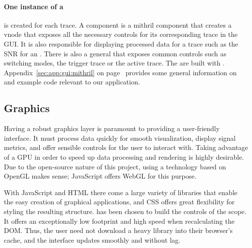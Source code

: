 \paragraph{One instance  of a }  is created for each  trace.  A
  component  is  a  mithril  component  that  creates  a  vnode
that  exposes  all the  necessary  controls  for  its corresponding  trace  in
the  GUI.   It   is  also  responsible  for  displaying   processed  data  for
a  trace   such  as  the  SNR   for  an  .   There   is  also  a
general    that  exposes  common  controls  such  as  switching
modes,  the  trigger   trace  or  the  active   trace.   The  
are   built   with  . Appendix~\ref{sec:app:gui:mithril}   on
page~\pageref{sec:app:gui:mithril}  provides   some  general   information  on
 and example code relevant to our application.

%
%
\subsection{Graphics} %
\label{subsec:gui:graphics}

Having  a robust graphics  layer  is paramount  to  providing a  user-friendly
interface. It  must process  data  quickly for  smooth visualization,  display
signal  metrics,  and  offer  sensible  controls  for  the  user  to  interact
with. Taking  advantage of  a GPU  in order  to speed  up data  processing and
rendering is highly desirable. Due to  the open-source nature of this project,
using a  technology based on OpenGL  makes sense; JavaScript offers  WebGL for
this purpose.

With JavaScript and  HTML there come a large variety  of libraries that enable
the easy creation of graphical  applications, and CSS offers great flexibility
for  styling the  resulting structure.   has  been chosen  to
build the controls of the scope. It  offers an exceptionally low footprint and
high speed  when recalculating  the DOM. Thus,  the user  need not  download a
heavy library into  their browser's cache, and the  interface updates smoothly
and without lag.

